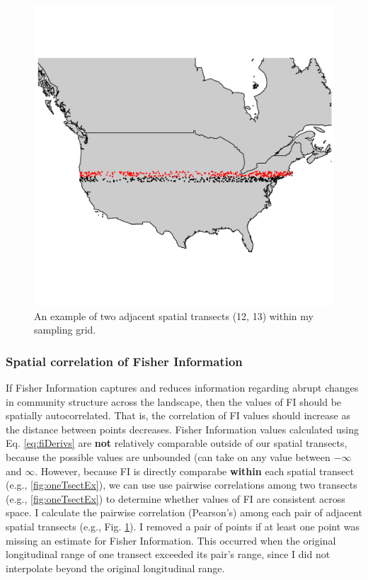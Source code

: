 \documentclass[12pt,twoside,openany]{reedthesis}
\begin{document}
\begin{figure}
\includegraphics[width=0.85\linewidth]{./chapterFiles/fisherSpatial/figures/figsCalledInDiss/transectSamplingEx_2rows} \caption{An example of two adjacent spatial transects (12, 13) within my sampling grid.}\label{fig:adjacentTsectEx}
\end{figure}
\hypertarget{spatial-correlation-of-fisher-information}{%
\subsubsection{Spatial correlation of Fisher Information}\label{spatial-correlation-of-fisher-information}}

If Fisher Information captures and reduces information regarding abrupt changes in community structure across the landscape, then the values of FI should be spatially autocorrelated. That is, the correlation of FI values should increase as the distance between points decreases. Fisher Information values calculated using Eq. \eqref{eq:fiDerivs} are \textbf{not} relatively comparable outside of our spatial transects, because the possible values are unbounded (can take on any value between \(-\infty\) and \(\infty\). However, because FI is directly comparabe \textbf{within} each spatial transect (e.g., \ref{fig:oneTsectEx}), we can use use pairwise correlations among two transects (e.g., \ref{fig:oneTsectEx}) to determine whether values of FI are consistent across space. I calculate the pairwise correlation (Pearson's) among each pair of adjacent spatial transects (e.g., Fig. \ref{fig:adjacentTsectEx}). I removed a pair of points if at least one point was missing an estimate for Fisher Information. This occurred when the original longitudinal range of one transect exceeded its pair's range, since I did not interpolate beyond the original longitudinal range.
\end{document}
